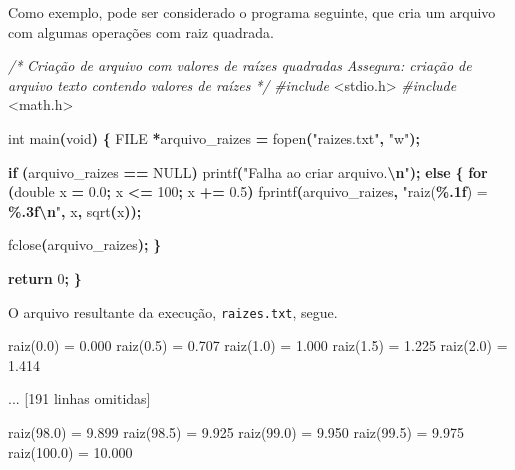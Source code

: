 \documentclass[
  11pt,
  a4paper,
]{scrbook}
\newenvironment{Shaded}{\begin{snugshade}}{\end{snugshade}}
\newcommand{\CommentTok}[1]{\textcolor[rgb]{0.56,0.35,0.01}{\textit{#1}}}
\newcommand{\ControlFlowTok}[1]{\textcolor[rgb]{0.13,0.29,0.53}{\textbf{#1}}}
\newcommand{\DataTypeTok}[1]{\textcolor[rgb]{0.13,0.29,0.53}{#1}}
\newcommand{\DecValTok}[1]{\textcolor[rgb]{0.00,0.00,0.81}{#1}}
\newcommand{\FloatTok}[1]{\textcolor[rgb]{0.00,0.00,0.81}{#1}}
\newcommand{\ImportTok}[1]{#1}
\newcommand{\NormalTok}[1]{#1}
\newcommand{\OperatorTok}[1]{\textcolor[rgb]{0.81,0.36,0.00}{\textbf{#1}}}
\newcommand{\PreprocessorTok}[1]{\textcolor[rgb]{0.56,0.35,0.01}{\textit{#1}}}
\newcommand{\SpecialCharTok}[1]{\textcolor[rgb]{0.81,0.36,0.00}{\textbf{#1}}}
\newcommand{\StringTok}[1]{\textcolor[rgb]{0.31,0.60,0.02}{#1}}
\begin{document}
Como exemplo, pode ser considerado o programa seguinte, que cria um
arquivo com algumas operações com raiz quadrada.

\begin{Shaded}
\begin{Highlighting}[]
\CommentTok{/*}
\CommentTok{Criação de arquivo com valores de raízes quadradas}
\CommentTok{Assegura: criação de arquivo texto contendo valores de raízes}
\CommentTok{*/}
\PreprocessorTok{\#include }\ImportTok{\textless{}stdio.h\textgreater{}}
\PreprocessorTok{\#include }\ImportTok{\textless{}math.h\textgreater{}}

\DataTypeTok{int}\NormalTok{ main}\OperatorTok{(}\DataTypeTok{void}\OperatorTok{)} \OperatorTok{\{}
    \DataTypeTok{FILE} \OperatorTok{*}\NormalTok{arquivo\_raizes }\OperatorTok{=}\NormalTok{ fopen}\OperatorTok{(}\StringTok{"raizes.txt"}\OperatorTok{,} \StringTok{"w"}\OperatorTok{);}

    \ControlFlowTok{if} \OperatorTok{(}\NormalTok{arquivo\_raizes }\OperatorTok{==}\NormalTok{ NULL}\OperatorTok{)}
\NormalTok{        printf}\OperatorTok{(}\StringTok{"Falha ao criar arquivo.}\SpecialCharTok{\textbackslash{}n}\StringTok{"}\OperatorTok{);}
    \ControlFlowTok{else} \OperatorTok{\{}
        \ControlFlowTok{for} \OperatorTok{(}\DataTypeTok{double}\NormalTok{ x }\OperatorTok{=} \FloatTok{0.0}\OperatorTok{;}\NormalTok{ x }\OperatorTok{\textless{}=} \DecValTok{100}\OperatorTok{;}\NormalTok{ x }\OperatorTok{+=} \FloatTok{0.5}\OperatorTok{)}
\NormalTok{            fprintf}\OperatorTok{(}\NormalTok{arquivo\_raizes}\OperatorTok{,} \StringTok{"raiz(}\SpecialCharTok{\%.1f}\StringTok{) = }\SpecialCharTok{\%.3f\textbackslash{}n}\StringTok{"}\OperatorTok{,}\NormalTok{ x}\OperatorTok{,}\NormalTok{ sqrt}\OperatorTok{(}\NormalTok{x}\OperatorTok{));}

\NormalTok{        fclose}\OperatorTok{(}\NormalTok{arquivo\_raizes}\OperatorTok{);}
    \OperatorTok{\}}

    \ControlFlowTok{return} \DecValTok{0}\OperatorTok{;}
\OperatorTok{\}}
\end{Highlighting}
\end{Shaded}

O arquivo resultante da execução, \texttt{raizes.txt}, segue.

\begin{Shaded}
\begin{Highlighting}[]
\NormalTok{raiz(0.0) = 0.000}
\NormalTok{raiz(0.5) = 0.707}
\NormalTok{raiz(1.0) = 1.000}
\NormalTok{raiz(1.5) = 1.225}
\NormalTok{raiz(2.0) = 1.414}

\NormalTok{... [191 linhas omitidas]}

\NormalTok{raiz(98.0) = 9.899}
\NormalTok{raiz(98.5) = 9.925}
\NormalTok{raiz(99.0) = 9.950}
\NormalTok{raiz(99.5) = 9.975}
\NormalTok{raiz(100.0) = 10.000}
\end{Highlighting}
\end{Shaded}
\end{document}
